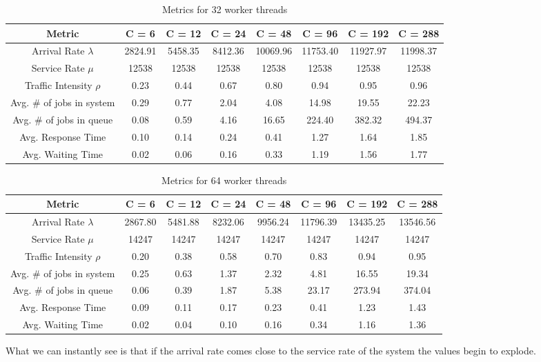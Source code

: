 \documentclass[11pt,a4paper]{article}
\begin{document}
%
\begin{table}[H]
\centering
\scriptsize{
\begin{tabular}{c|ccccccc}
\hline Metric & C = 6 & C = 12 & C = 24 & C = 48 & C = 96 & C = 192 & C = 288\\
\hline
Arrival Rate $\lambda$ & 2824.91 & 5458.35 & 8412.36 & 10069.96 & 11753.40 & 11927.97 & 11998.37\\
Service Rate $\mu$ & 12538 & 12538 & 12538 & 12538 & 12538 & 12538 & 12538\\
Traffic Intensity $\rho$ & 0.23 & 0.44 & 0.67 & 0.80 & 0.94 & 0.95 & 0.96\\
Avg. \# of jobs in system & 0.29 & 0.77 & 2.04 & 4.08 & 14.98 & 19.55 & 22.23\\
Avg. \# of jobs in queue & 0.08 & 0.59 & 4.16 & 16.65 & 224.40 & 382.32 & 494.37\\
Avg. Response Time & 0.10 & 0.14 & 0.24 & 0.41 & 1.27 & 1.64 & 1.85\\
Avg. Waiting Time & 0.02 & 0.06 & 0.16 & 0.33 & 1.19 & 1.56 & 1.77\\
\end{tabular}
}
\caption{Metrics for 32 worker threads}
\end{table}
%
\begin{table}[H]
\centering
\scriptsize{
\begin{tabular}{c|ccccccc}
\hline Metric & C = 6 & C = 12 & C = 24 & C = 48 & C = 96 & C = 192 & C = 288\\
\hline
Arrival Rate $\lambda$ & 2867.80 & 5481.88 & 8232.06 & 9956.24 & 11796.39 & 13435.25 & 13546.56\\
Service Rate $\mu$ & 14247 & 14247 & 14247 & 14247 & 14247 & 14247 & 14247\\
Traffic Intensity $\rho$ & 0.20 & 0.38 & 0.58 & 0.70 & 0.83 & 0.94 & 0.95\\
Avg. \# of jobs in system & 0.25 & 0.63 & 1.37 & 2.32 & 4.81 & 16.55 & 19.34\\
Avg. \# of jobs in queue & 0.06 & 0.39 & 1.87 & 5.38 & 23.17 & 273.94 & 374.04\\
Avg. Response Time & 0.09 & 0.11 & 0.17 & 0.23 & 0.41 & 1.23 & 1.43\\
Avg. Waiting Time & 0.02 & 0.04 & 0.10 & 0.16 & 0.34 & 1.16 & 1.36\\
\end{tabular}
}
\caption{Metrics for 64 worker threads}
\end{table}
%
What we can instantly see is that if the arrival rate comes close to the service rate of the system the values begin to explode. 
\end{document}
